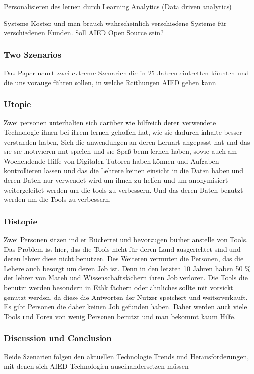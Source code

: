 Personalisieren des lernen durch Learning Analytics (Data driven analytics)

Systeme Kosten und man brauch wahrscheinlich verschiedene Systeme für verschiedenen Kunden. Soll AIED Open Source sein?




\subsubsection{Two Szenarios}
Das Paper nennt zwei extreme Szenarien die in 25 Jahren eintretten könnten und die uns vorauge führen sollen, in welche Rcithungen AIED gehen kann
\subsubsection{Utopie}
Zwei personen unterhalten sich darüber wie hilfreich deren verwendete Technologie ihnen bei ihrem
lernen geholfen hat, wie sie dadurch inhalte besser verstanden haben, Sich die anwendungen an deren Lernart angepasst hat und das sie sie motivieren mit spielen und sie Spaß beim lernen haben, sowie auch am Wochendende Hilfe von Digitalen Tutoren haben können und Aufgaben kontrollieren lassen
und das die Lehrere keinen einsicht in die Daten haben und deren Daten nur verwendet wird um ihnen zu helfen und um anonymisiert weitergeleitet werden um die tools zu verbessern. Und das deren Daten benutzt werden um die Tools zu verbessern.
\subsubsection{Distopie}
Zwei Personen sitzen ind er Bücherrei und bevorzugen bücher anstelle von Tools. Das Problem ist hier, das die Tools nicht für deren Land ausgerichtet sind und deren lehrer diese nicht benutzen. 
Des Weiteren vermuten die Personen, das die Lehere auch besorgt um deren Job ist. Denn in den letzten 10 Jahren haben 50 \% der lehrer von Mateh und Wissenschaftsfächern ihren Job verloren.
Die Tools die benutzt werden besondern in Ethk fächern oder ähnliches sollte mit vorsicht genutzt werden, da diese die Antworten der Nutzer speichert und weiterverkauft. Es gibt Personen die daher keinen Job gefunden haben.
Daher werden auch viele Tools und Foren von wenig Personen benutzt und man bekommt kaum Hilfe.

\subsubsection{Discussion und Conclusion}
Beide Szenarien folgen den aktuellen Technologie Trends und Herausforderungen, mit denen sich AIED Technologien auseinandersetzen müssen

